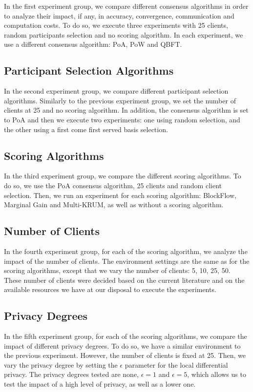 In the first experiment group, we compare different consensus algorithms in order to analyze their impact, if any, in accuracy, convergence, communication and computation costs. To do so, we execute three experiments with 25 clients, random participants selection and no scoring algorithm. In each experiment, we use a different consensus algorithm: PoA, PoW and QBFT.

\subsection{Participant Selection Algorithms}

In the second experiment group, we compare different participant selection algorithms. Similarly to the previous experiment group, we set the number of clients at 25 and no scoring algorithm. In addition, the consensus algorithm is set to PoA and then we execute two experiments: one using random selection, and the other using a first come first served basis selection.

\subsection{Scoring Algorithms}

In the third experiment group, we compare the different scoring algorithms. To do so, we use the PoA consensus algorithm, 25 clients and random client selection. Then, we run an experiment for each scoring algorithm: BlockFlow, Marginal Gain and Multi-KRUM, as well as without a scoring algorithm.

\subsection{Number of Clients}

In the fourth experiment group, for each of the scoring algorithm, we analyze the impact of the number of clients. The environment settings are the same as for the scoring algorithms, except that we vary the number of clients: 5, 10, 25, 50. These number of clients were decided based on the current literature and on the available resources we have at our disposal to execute the experiments.

\subsection{Privacy Degrees}

In the fifth experiment group, for each of the scoring algorithms, we compare the impact of different privacy degrees. To do so, we have a similar environment to the previous experiment. However, the number of clients is fixed at 25. Then, we vary the privacy degree by setting the $\epsilon$ parameter for the local differential privacy. The privacy degrees tested are none, $\epsilon = 1$ and $\epsilon = 5$, which allows us to test the impact of a high level of privacy, as well as a lower one.

